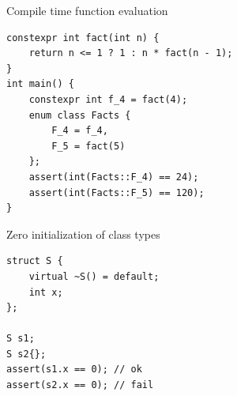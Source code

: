 \documentclass[11pt]{beamer}
\begin{document}
\begin{frame}[fragile]{Compile time function evaluation}
\begin{lstlisting}
constexpr int fact(int n) {
	return n <= 1 ? 1 : n * fact(n - 1);
}
int main() {
	constexpr int f_4 = fact(4);
	enum class Facts {
		F_4 = f_4,
		F_5 = fact(5)
	};
	assert(int(Facts::F_4) == 24);
	assert(int(Facts::F_5) == 120);
}
\end{lstlisting}
\end{frame}



\begin{frame}[fragile]{Zero initialization of class types}
\begin{lstlisting}
struct S {
	virtual ~S() = default;
	int x;
};

S s1;
S s2{};
assert(s1.x == 0); // ok
assert(s2.x == 0); // fail
\end{lstlisting}
\end{frame}

%
%
\end{document}
